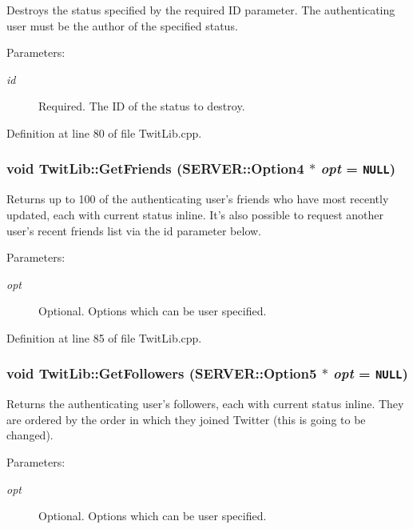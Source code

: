 Destroys the status specified by the required ID parameter. The authenticating user must be the author of the specified status. \begin{Desc}
\item[Parameters:]
\begin{description}
\item[{\em id}]Required. The ID of the status to destroy. \end{description}
\end{Desc}


Definition at line 80 of file TwitLib.cpp.\hypertarget{classTwitLib_27dd0d45500cb4cd8f32a92a255eba8d}{
\subsubsection{\setlength{\rightskip}{0pt plus 5cm}void TwitLib::GetFriends ({\bf SERVER::Option4} $\ast$ {\em opt} = {\tt NULL})}}
\label{classTwitLib_27dd0d45500cb4cd8f32a92a255eba8d}


Returns up to 100 of the authenticating user's friends who have most recently updated, each with current status inline. It's also possible to request another user's recent friends list via the id parameter below. \begin{Desc}
\item[Parameters:]
\begin{description}
\item[{\em opt}]Optional. Options which can be user specified. \end{description}
\end{Desc}


Definition at line 85 of file TwitLib.cpp.\hypertarget{classTwitLib_5a49752d1e872fe3cf8a5c055b5c2f9a}{
\subsubsection{\setlength{\rightskip}{0pt plus 5cm}void TwitLib::GetFollowers ({\bf SERVER::Option5} $\ast$ {\em opt} = {\tt NULL})}}
\label{classTwitLib_5a49752d1e872fe3cf8a5c055b5c2f9a}


Returns the authenticating user's followers, each with current status inline. They are ordered by the order in which they joined Twitter (this is going to be changed). \begin{Desc}
\item[Parameters:]
\begin{description}
\item[{\em opt}]Optional. Options which can be user specified. \end{description}
\end{Desc}


